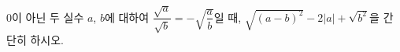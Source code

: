 $0$이 아닌 두 실수 $a$, $b$에 대하여 $\dfrac{\sqrt{a}}{\sqrt{b}}=-\sqrt{\dfrac{a}{b}}$일 때, $\sqrt{(a-b)^2}-2|a|+\sqrt{b^2}$을 간단히 하시오.
